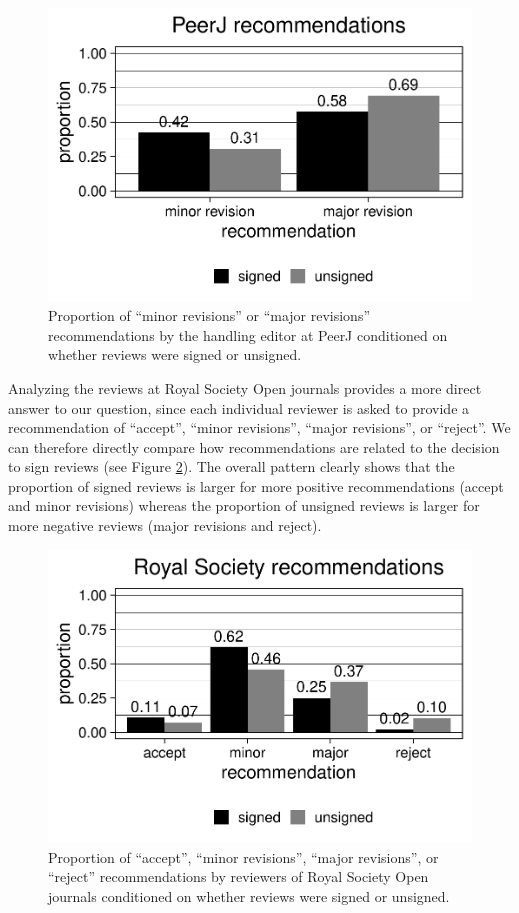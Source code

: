 \documentclass[
  english,
  ,jou, a4paper,floatsintext]{apa6}
\begin{document}
\begin{figure}
\centering
\includegraphics{open_peer_review_files/figure-latex/PeerJrec-1.pdf}
\caption{\label{fig:PeerJrec}Proportion of \enquote{minor revisions} or \enquote{major revisions} recommendations by the handling editor at PeerJ conditioned on whether reviews were signed or unsigned.}
\end{figure}

Analyzing the reviews at Royal Society Open journals provides a more direct answer to our question, since each individual reviewer is asked to provide a recommendation of \enquote{accept}, \enquote{minor revisions}, \enquote{major revisions}, or \enquote{reject}. We can therefore directly compare how recommendations are related to the decision to sign reviews (see Figure \ref{fig:TRSrec}). The overall pattern clearly shows that the proportion of signed reviews is larger for more positive recommendations (accept and minor revisions) whereas the proportion of unsigned reviews is larger for more negative reviews (major revisions and reject).

\begin{figure}
\centering
\includegraphics{open_peer_review_files/figure-latex/TRSrec-1.pdf}
\caption{\label{fig:TRSrec}Proportion of \enquote{accept}, \enquote{minor revisions}, \enquote{major revisions}, or \enquote{reject} recommendations by reviewers of Royal Society Open journals conditioned on whether reviews were signed or unsigned.}
\end{figure}
\end{document}
